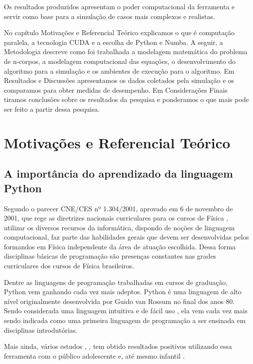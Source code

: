 \documentclass[
	12pt,				%
	a4paper,			%
	english,			%
	openright,				%
	brazil,				%
	oneside]{abntex2}
\begin{document}
	Os resultados produzidos apresentam o poder computacional da ferramenta e servir como base para a simulação de casos mais complexos e realistas.
	
	No capítulo Motivações e Referencial Teórico explicamos o que é computação paralela, a tecnologia CUDA e a escolha de Python e Numba. A seguir, a Metodologia descreve como foi trabalhada a modelagem matemática do problema de n-corpos, a modelagem computacional das equações, o desenvolvimento do algoritmo para a simulação e os ambientes de execução para o algoritmo. Em Resultados e Discussões apresentamos os dados coletados pela simulação e os comparamos para obter medidas de desempenho. Em Considerações Finais tiramos conclusões sobre os resultados da pesquisa e ponderamos o que mais pode ser feito a partir dessa pesquisa.

\chapter[Motivações e Referencial Teórico]{Motivações e Referencial Teórico}
  	
\section{A importância do aprendizado da linguagem Python}
 
Segundo o parecer CNE/CES nº 1.304/2001, aprovado em 6 de novembro de 2001, que rege as diretrizes nacionais curriculares para os cursos de Física \cite{mec}, utilizar os diversos recursos da informática, dispondo de noções de linguagem computacional, faz parte das habilidades gerais que devem ser desenvolvidas pelos formandos em Física independente da área de atuação escolhida.
Dessa forma disciplinas básicas de programação são presenças constantes nas grades curriculares dos cursos de Física brasileiros. 

Dentre as linguagens de programação trabalhadas em cursos de graduação, Python vem ganhando cada vez mais adeptos. Python \cite{Python} é uma linguagem de alto nível originalmente desenvolvida por Guido van Rossum no final dos anos 80. Sendo considerada uma linguagem intuitiva e de fácil uso \cite{fangohr}, ela vem cada vez mais sendo indicada como uma primeira linguagem de programação a ser ensinada em disciplinas introdutórias. 

Mais ainda, vários estudos \cite{pythonmedio}, \cite{ensino}, \cite{publico} tem obtido resultados positivos utilizando essa ferramenta com o público adolescente e, até mesmo infantil \cite{briggs}.
\end{document}

